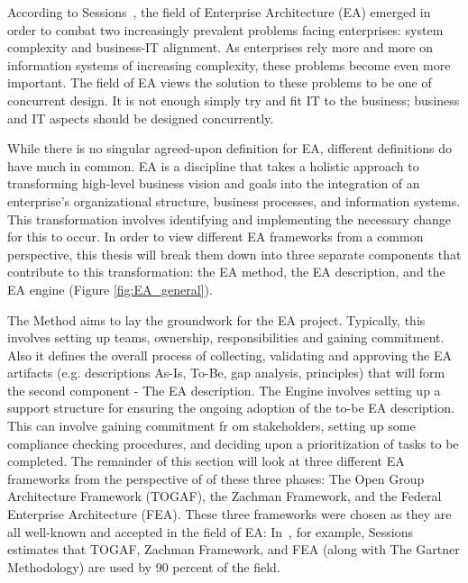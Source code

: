 
According to Sessions~\cite{sessions2007}, the field of Enterprise Architecture (EA) emerged in order to combat two increasingly prevalent problems facing enterprises: system complexity and business-IT alignment. As enterprises rely more and more on information systems of increasing complexity, these problems become even more important. The field of EA views the solution to these problems to be one of concurrent design. It is not enough simply try and fit IT to the business; business and IT aspects should be designed concurrently. 

While there is no singular agreed-upon definition for EA, different definitions\cite{jungle2004,GartnerInc,ross2006,pearlson2009,lankhorst2009,sessions2007,togaf9.1} do have much in common. EA is a discipline that takes a holistic approach to transforming high-level business vision and goals into the integration of an enterprise's organizational structure, business processes, and information systems. This transformation involves identifying and implementing the necessary change for this to occur. In order to view different EA frameworks from a common perspective, this thesis will break them down into three separate components that contribute to this transformation: the EA method, the EA description, and the EA engine (Figure \ref{fig:EA_general}). 

The Method aims to lay the groundwork for the EA project. Typically, this involves setting up teams, ownership, responsibilities and gaining commitment. Also it defines the overall process of collecting, validating and approving the EA artifacts  (e.g. descriptions As-Is, To-Be, gap analysis,  principles) that will form the second component - The EA description.  The Engine involves setting up a support structure for ensuring the ongoing adoption of the to-be EA description. This can involve gaining commitment fr  om stakeholders, setting up some compliance checking procedures, and deciding upon a prioritization of tasks to be completed. The remainder of this section will look at three different EA frameworks from the perspective of of these three phases: The Open Group Architecture Framework (TOGAF), the Zachman Framework, and the Federal Enterprise Architecture (FEA). These three frameworks were chosen as they are all well-known and accepted in the field of EA: In~\cite{sessions2007}, for example, Sessions estimates that TOGAF, Zachman Framework, and FEA (along with The Gartner Methodology) are used by 90 percent of the field.

